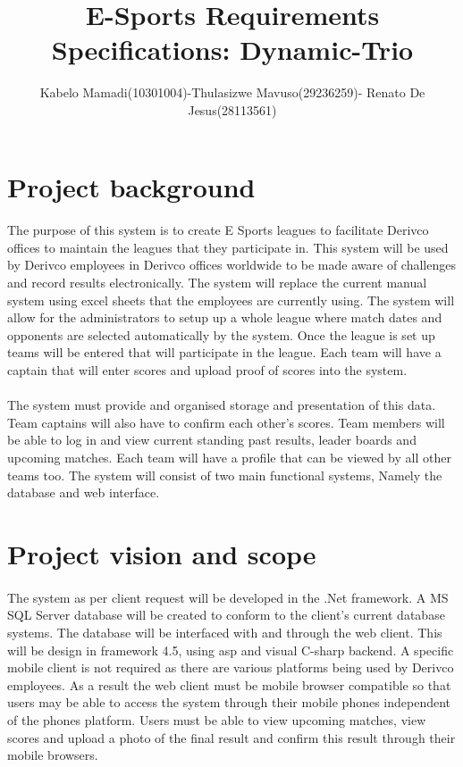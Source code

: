 \documentclass[11pt,a4paper]{article}
\begin{document}
\begin{titlepage}
\title{E-Sports Requirements Specifications: Dynamic-Trio}
\author{Kabelo Mamadi(10301004)-Thulasizwe Mavuso(29236259)- Renato De Jesus(28113561)}
\maketitle
\end{titlepage}


\section{Project background}
\paragraph{}The
purpose of this system is to create E Sports leagues to facilitate Derivco offices to maintain the leagues that they participate in. This system will be used by Derivco employees in Derivco offices worldwide to be made aware of challenges and record results electronically. The system will replace the current manual system using excel sheets that the employees are currently using. The system will allow for the administrators to setup up a whole league where match dates and opponents are selected automatically by the system. Once the league is set up teams will be entered that will participate in the league. Each team will have a captain that will enter scores and upload proof of scores into the system.

\paragraph{}The system must provide and organised storage and presentation of this data. Team captains will also have to confirm each other’s scores. Team members will be able to log in and view current standing past results, leader boards and upcoming matches. Each team will have a profile that can be viewed by all other teams too. The system will consist of two main functional systems, Namely the database and web interface.

\section{Project vision and scope}
\paragraph{}The system as per client request will be developed in the .Net framework. A MS SQL Server database will be created to conform to the client’s current database systems. The database will be interfaced with and through the web client. This will be design in framework 4.5, using asp and visual C-sharp backend. A specific mobile client is not required as there are various platforms being used by Derivco employees. As a result the web client must be mobile browser compatible so that users may be able to access the system through their mobile phones independent of the phones platform. Users must be able to view upcoming matches, view scores and upload a photo of the final result and confirm this result through their mobile browsers.
\end{document}
